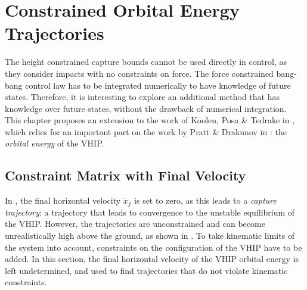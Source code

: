 %
\chapter{Constrained Orbital Energy Trajectories}\label{chap:mpc}
The height constrained capture bounds cannot be used directly in control, as they consider impacts with no constraints on force. The force constrained bang-bang control law has to be integrated numerically to have knowledge of future states. Therefore, it is interesting to explore an additional method that has knowledge over future states, without the drawback of numerical integration. This chapter proposes an extension to the work of Koolen, Posa \& Tedrake in \cite{koolen2016balance}, which relies for an important part on the work by Pratt \& Drakunov in \cite{pratt2007derivation}: the \textit{orbital energy} of the \ac{VHIP}.

\section{Constraint Matrix with Final Velocity}
In \cite{koolen2016balance}, the final horizontal velocity $\dot{x}_f$ is set to zero, as this leads to a \textit{capture trajectory}: a trajectory that leads to convergence to the unstable equilibrium of the \ac{VHIP}. However, the trajectories are unconstrained and can become unrealistically high above the ground, as shown in . To take kinematic limits of the system into account, constraints on the configuration of the \ac{VHIP} have to be added. In this section, the final horizontal velocity of the \ac{VHIP} orbital energy is left undetermined, and used to find trajectories that do not violate kinematic constraints.

